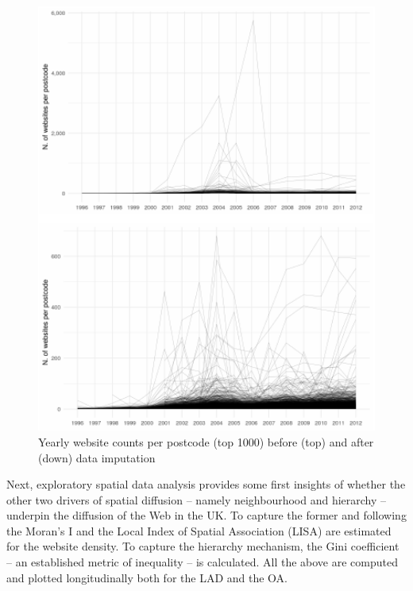 \documentclass[
  authoryear,
  preprint,
  3p]{elsarticle}
\begin{document}
\begin{figure}[H]

{\centering \includegraphics[width=1\textwidth,height=0.7\textheight]{anonymised_files/figure-pdf/unnamed-chunk-2-1.pdf}

}

\caption{\label{correct}Yearly website counts per postcode (top 1000)
before (top) and after (down) data imputation}

\end{figure}%

Next, exploratory spatial data analysis provides some first insights of
whether the other two drivers of spatial diffusion -- namely
neighbourhood and hierarchy -- underpin the diffusion of the Web in the
UK. To capture the former and following \citet{ding2010modeling} the
Moran's I and the Local Index of Spatial Association (LISA) are
estimated for the website density. To capture the hierarchy mechanism,
the Gini coefficient -- an established metric of inequality -- is
calculated. All the above are computed and plotted longitudinally both
for the LAD and the OA.
\end{document}
